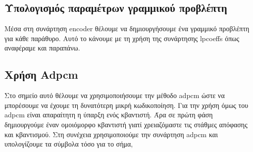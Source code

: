\subsection{Υπολογισμός παραμέτρων γραμμικού προβλέπτη}
\par Μέσα στη συνάρτηση encoder θέλουμε να δημιουργήσουμε ένα γραμμικό προβλέπτη για 
κάθε παράθυρο. Αυτό το κάνουμε με τη χρήση της συνάρτησης lpcoeffs όπως αναφέραμε και 
παραπάνω.

\subsection{Χρήση Adpcm}
\par Στο σημείο αυτό θέλουμε να χρησιμοποιήσουμε την μέθοδο adpcm ώστε να μπορέσουμε 
να έχουμε τη δυνατότερη μικρή κωδικοποίηση. Για την χρήση όμως του adpcm είναι 
απαραίτητη η ύπαρξη ενός κβαντιστή. Άρα σε πρώτη φάση δημιουργούμε έναν ομοιόμορφο 
κβαντιστή γιατί χρειαζόμαστε τις στάθμες απόφασης και κβαντισμού. Στη συνέχεια 
χρησιμοποιούμε την συνάρτηση adpcm και υπολογίζουμε τα σύμβολα τόσο για το σήμα, 


